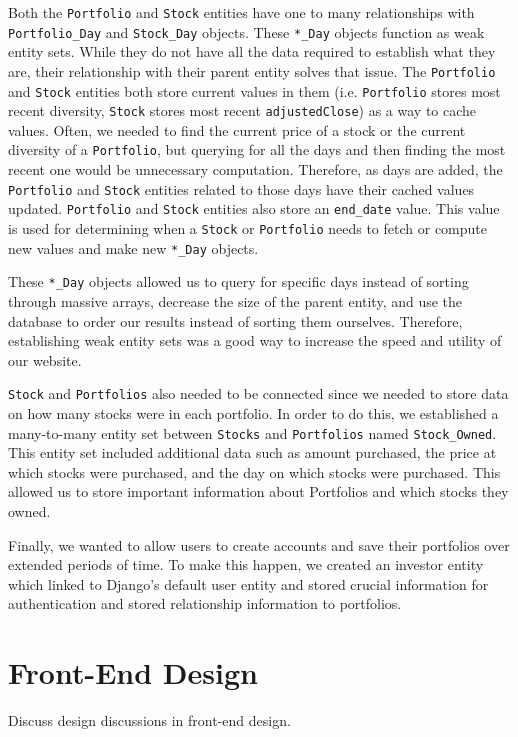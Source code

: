 \documentclass{article}
\begin{document}
Both the \texttt{Portfolio} and \texttt{Stock} entities have one to many relationships with \texttt{Portfolio\_Day} and \texttt{Stock\_Day} objects. These \texttt{*\_Day} objects function as weak entity sets. While they do not have all the data required to establish what they are, their relationship with their parent entity solves that issue. The \texttt{Portfolio} and \texttt{Stock} entities both store current values in them (i.e. \texttt{Portfolio} stores most recent diversity, \texttt{Stock} stores most recent \texttt{adjustedClose}) as a way to cache values. Often, we needed to find the current price of a stock or the current diversity of a \texttt{Portfolio}, but querying for all the days and then finding the most recent one would be unnecessary computation. Therefore, as days are added, the \texttt{Portfolio} and \texttt{Stock} entities related to those days have their cached values updated.  \texttt{Portfolio} and \texttt{Stock} entities also store an \texttt{end\_date} value.  This value is used for determining when a \texttt{Stock} or \texttt{Portfolio} needs to fetch or compute new values and make new \texttt{*\_Day} objects.  


These \texttt{*\_Day} objects allowed us to query for specific days instead of sorting through massive arrays, decrease the size of the parent entity, and use the database to order our results instead of sorting them ourselves.  Therefore, establishing weak entity sets was a good way to increase the speed and utility of our website.


\texttt{Stock} and \texttt{Portfolios} also needed to be connected since we needed to store data on how many stocks were in each portfolio.  In order to do this, we established a many-to-many entity set between \texttt{Stocks} and \texttt{Portfolios} named \texttt{Stock\_Owned}.  This entity set included additional data such as amount purchased, the price at which stocks were purchased, and the day on which stocks were purchased.  This allowed us to store important information about Portfolios and which stocks they owned.


Finally, we wanted to allow users to create accounts and save their portfolios over extended periods of time.  To make this happen, we created an investor entity which linked to Django’s default user entity and stored crucial information for authentication and stored relationship information to portfolios.


\section{Front-End Design}
Discuss design discussions in front-end design.
\end{document}
